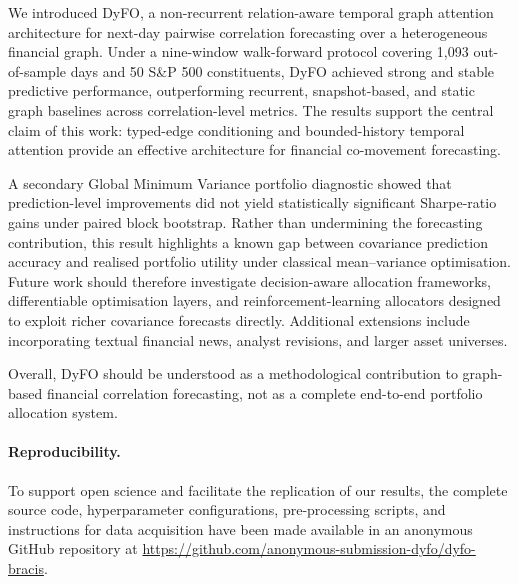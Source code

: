 \documentclass[runningheads]{llncs}
\begin{document}

We introduced DyFO, a non-recurrent relation-aware temporal graph attention architecture for next-day pairwise correlation forecasting over a heterogeneous financial graph. Under a nine-window walk-forward protocol covering 1,093 out-of-sample days and 50 S\&P 500 constituents, DyFO achieved strong and stable predictive performance, outperforming recurrent, snapshot-based, and static graph baselines across correlation-level metrics. The results support the central claim of this work: typed-edge conditioning and bounded-history temporal attention provide an effective architecture for
financial co-movement forecasting.

A secondary Global Minimum Variance portfolio diagnostic showed that prediction-level improvements did not yield statistically significant Sharpe-ratio gains under paired block bootstrap. Rather than undermining the forecasting contribution, this result highlights a known gap between covariance prediction accuracy and realised portfolio utility under classical mean--variance optimisation. Future work should therefore investigate decision-aware allocation frameworks, differentiable optimisation layers, and reinforcement-learning allocators designed to exploit richer covariance
forecasts directly. Additional extensions include incorporating textual financial news, analyst revisions, and larger asset universes.

Overall, DyFO should be understood as a methodological contribution to graph-based financial correlation forecasting, not as a complete end-to-end portfolio allocation system.

\paragraph{Reproducibility.} To support open science and facilitate the replication of our results, the complete source code, hyperparameter configurations, pre-processing scripts, and instructions for data acquisition have been made available in an anonymous GitHub repository at \url{https://github.com/anonymous-submission-dyfo/dyfo-bracis}.
\end{document}
